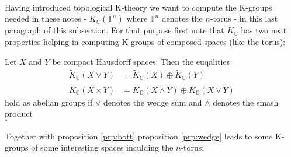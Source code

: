 \\
Having introduced topological K-theory we want to compute the K-groups needed in these notes - $K_{\mathbb{C}}(\mathbb{T}^{n})$ where $\mathbb{T}^{n}$ denotes the $n$-torus - in this last paragraph of this subsection. For that purpose first note that $\tilde{K}_{\mathbb{C}}$ has two neat properties helping in computing K-groups of composed spaces (like the torus):
\\
\begin{prp}
\label{prp:wedge}
Let $X$ and $Y$ be compact Hausdorff spaces. Then the euqalities
\begin{align*}
  \tilde{K}_{\mathbb{C}}(X \vee Y)
  &=
  \tilde{K}_{\mathbb{C}}(X)
  \oplus
  \tilde{K}_{\mathbb{C}}(Y)
  \\
  \tilde{K}_{\mathbb{C}}(X \times Y)
  &=
  \tilde{K}_{\mathbb{C}}(X \wedge Y)
  \oplus
  \tilde{K}_{\mathbb{C}}(X \vee Y)
\end{align*}
hold as abelian groups if $\vee$ denotes the wedge sum and $\wedge$ denotes the smash product
\\
\phantom{proven}
\hfill
$\square$
\end{prp}
Together with proposition \ref{prp:bott} proposition \ref{prp:wedge} leads to some K-groups of some interesting spaces inculding the $n$-torus:
\\
